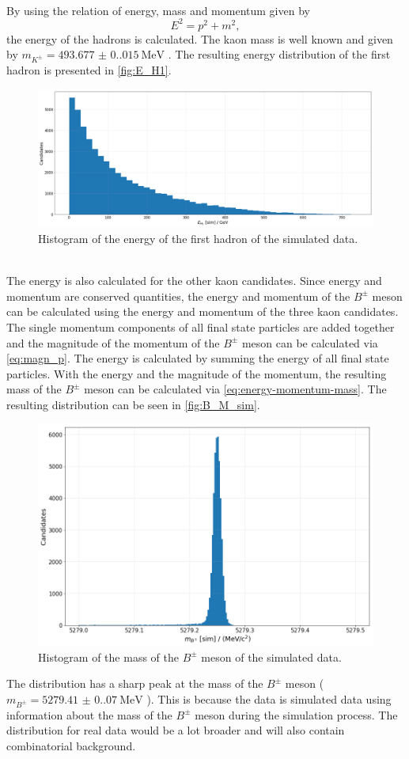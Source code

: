 \\ By using the relation of energy, mass and momentum given by 
\begin{equation}
  \label{eq:energy-momentum-mass}
  E^2 = p^2 + m^2,
\end{equation}
the energy of the hadrons is calculated. The kaon mass is well known and given by $m_{K^{\pm}} = \qty{493.677(0.015)}{\mega\electronvolt}$ \cite{PDG}. The resulting energy distribution of the first hadron is presented in \autoref{fig:E_H1}.
\begin{figure}
  \centering
  \includegraphics[width = .7\textwidth]{"content/pics/E_H1.png"}
  \caption{Histogram of the energy of the first hadron of the simulated data.}
  \label{fig:E_H1}
\end{figure}
\\The energy is also calculated for the other kaon candidates. Since energy and momentum are conserved quantities, the energy and momentum of the $B^{\pm}$ meson can be calculated
using the energy and momentum of the three kaon candidates. The single momentum components of all final state particles are added together and the magnitude of the momentum of the $B^{\pm}$
meson can be calculated via \autoref{eq:magn_p}. The energy is calculated by summing the energy of all final state particles. With the energy and the magnitude of the momentum, the resulting
mass of the $B^{\pm}$ meson can be calculated via \autoref{eq:energy-momentum-mass}. The resulting distribution can be seen in \autoref{fig:B_M_sim}.
\begin{figure}
  \centering
  \includegraphics[width = .6\textwidth]{"content/pics/B_M_sim.png"}
  \caption{Histogram of the mass of the $B^{\pm}$ meson of the simulated data.}
  \label{fig:B_M_sim}
\end{figure}
The distribution has a sharp peak at the mass of the $B^{\pm}$ meson ($m_{B^{\pm}} = \qty{5279.41(0.07)}{\mega\electronvolt}$ \cite{PDG}). This is because the data is simulated data using information about the mass of the $B^{\pm}$ meson during
the simulation process. The distribution for real data would be a lot broader and will also contain combinatorial background.

